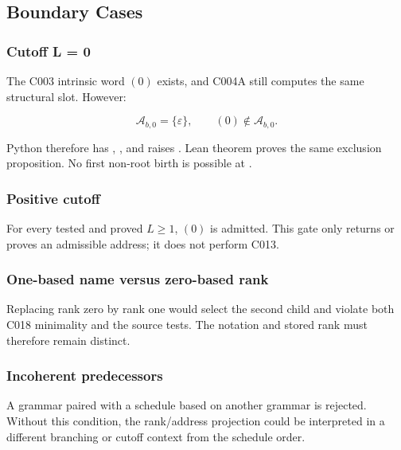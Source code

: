 \subsection{Boundary Cases}\label{boundary-cases-2}

\subsubsection{Cutoff L = 0}\label{cutoff-l-0}

The C003 intrinsic word \((0)\) exists, and C004A still computes the
same structural slot. However:

\[
\mathcal A_{b,0}=\{\varepsilon\},
\qquad
(0)\notin\mathcal A_{b,0}.
\]

Python therefore has \texttt{\protect{}},
\texttt{\protect{}}, and
\texttt{\protect{}} raises \texttt{\protect{}}. Lean
theorem \texttt{\protect{}} proves the same exclusion
proposition. No first non-root birth is possible at \texttt{\protect{}}.

\subsubsection{Positive cutoff}\label{positive-cutoff}

For every tested and proved \(L\ge1\), \((0)\) is admitted. This gate
only returns or proves an admissible address; it does not perform C013.

\subsubsection{One-based name versus zero-based
rank}\label{one-based-name-versus-zero-based-rank}

Replacing rank zero by rank one would select the second child and
violate both C018 minimality and the source tests. The notation and
stored rank must therefore remain distinct.

\subsubsection{Incoherent predecessors}\label{incoherent-predecessors}

A grammar paired with a schedule based on another grammar is rejected.
Without this condition, the rank/address projection could be interpreted
in a different branching or cutoff context from the schedule order.

